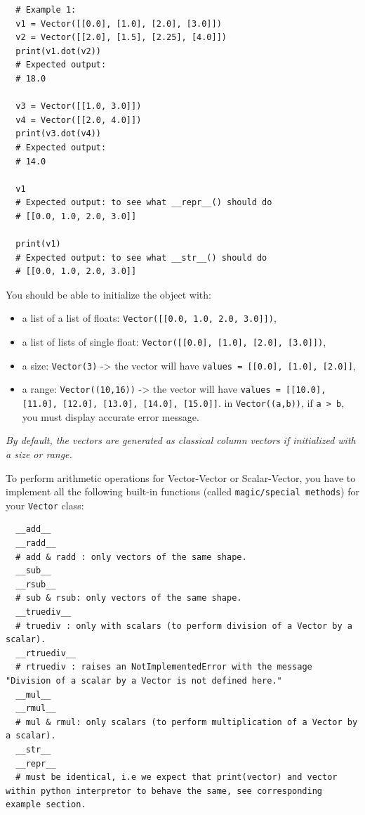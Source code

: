 \documentclass{42-en}
\begin{document}
\begin{verbatim}
  # Example 1:
  v1 = Vector([[0.0], [1.0], [2.0], [3.0]])
  v2 = Vector([[2.0], [1.5], [2.25], [4.0]])
  print(v1.dot(v2))
  # Expected output:
  # 18.0

  v3 = Vector([[1.0, 3.0]])
  v4 = Vector([[2.0, 4.0]])
  print(v3.dot(v4))
  # Expected output:
  # 14.0

  v1
  # Expected output: to see what __repr__() should do
  # [[0.0, 1.0, 2.0, 3.0]]

  print(v1)
  # Expected output: to see what __str__() should do
  # [[0.0, 1.0, 2.0, 3.0]]
\end{verbatim}

You should be able to initialize the object with:
\begin{itemize}
  \item a list of a list of floats: \texttt{Vector([[0.0, 1.0, 2.0, 3.0]])},
  \item a list of lists of single float: \texttt{Vector([[0.0], [1.0], [2.0], [3.0]])},
  \item a size: \texttt{Vector(3)} -> the vector will have \texttt{values = [[0.0], [1.0], [2.0]]},
  \item a range: \texttt{Vector((10,16))} -> the vector will have \texttt{values = [[10.0], [11.0], [12.0], [13.0], [14.0], [15.0]]}.
    in \texttt{Vector((a,b))}, if \texttt{a > b}, you must display accurate error message.
\end{itemize}

\textit{By default, the vectors are generated as classical column vectors if initialized with a size or range.}

To perform arithmetic operations for Vector-Vector or Scalar-Vector, you have to implement all the following built-in functions (called \texttt{magic/special methods}) for your \texttt{Vector} class:

\begin{verbatim}
  __add__
  __radd__
  # add & radd : only vectors of the same shape.
  __sub__
  __rsub__
  # sub & rsub: only vectors of the same shape.
  __truediv__
  # truediv : only with scalars (to perform division of a Vector by a scalar).
  __rtruediv__
  # rtruediv : raises an NotImplementedError with the message "Division of a scalar by a Vector is not defined here."
  __mul__
  __rmul__
  # mul & rmul: only scalars (to perform multiplication of a Vector by a scalar).
  __str__
  __repr__
  # must be identical, i.e we expect that print(vector) and vector within python interpretor to behave the same, see corresponding example section.
\end{verbatim}
\end{document}
